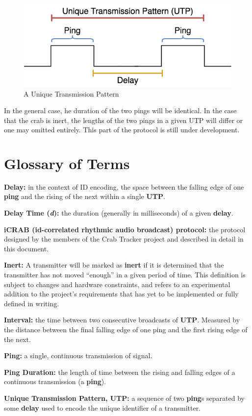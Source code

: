 \documentclass[12pt]{article}
\begin{document}
\begin{figure}[h]
\centering
\includegraphics[scale=0.5]{utp}

\caption{A Unique Transmission Pattern}\label{fig:utp}
\end{figure}

In the general case, he duration of the two pings will be identical.
In the case that the crab is inert, the lengths of the two pings in a given
UTP will differ or one may omitted entirely.
This part of the protocol is still under development.


\appendix
\section{Glossary of Terms} \label{glossary}

{\bf Delay:}
	in the context of ID encoding, the space between the falling edge of one
	{\bf ping} and the rising of the next within a single {\bf UTP}.

{\bf Delay Time ({\em d}):}
	the duration (generally in milliseconds) of a given {\bf delay}.

{\bf iCRAB (id-correlated rhythmic audio broadcast) protocol:}
	the protocol designed by the members of the Crab Tracker project and
	described in detail in this document.

{\bf Inert:}
	A transmitter will be marked as {\bf inert} if it is determined that the
	transmitter has not moved ``enough'' in a given period of time.
	This definition is subject to changes and hardware constraints, and
	refers to an experimental addition to the project's requirements that
	has yet to be implemented or fully defined in writing.

{\bf Interval:}
	the time between two consecutive broadcasts of {\bf UTP}. Measured by the
	distance between the final falling edge of one ping and the first rising
	edge of the next.

{\bf Ping:}
	a single, continuous transmission of signal.

{\bf Ping Duration:}
	the length of time between the rising and falling edges of a continuous
	transmission (a {\bf ping}).

{\bf Unique Transmission Pattern, UTP:}
	a sequence of two {\bf ping}s separated by some {\bf delay} used to
	encode the unique identifier of a transmitter.
\end{document}
